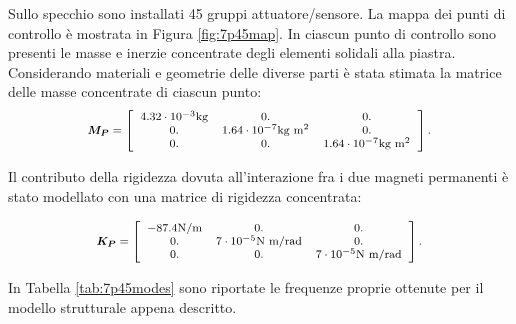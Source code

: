 Sullo specchio sono installati 45 gruppi attuatore/sensore. La mappa dei punti di controllo è mostrata in Figura \ref{fig:7p45map}. In ciascun punto di controllo sono presenti le masse e inerzie concentrate degli elementi solidali alla piastra. Considerando materiali e geometrie delle diverse parti è stata stimata la matrice delle masse concentrate di ciascun punto:
\begin{equation}
\label{eq:7concmass}
\footnotesize
\boldsymbol{M_P} = \left[\begin{array}{ccc}
 4.32\cdot 10^{-3}\text{kg} & 0.   &      0. \\
0.& 1.64\cdot 10^{-7} \text{kg m}^{2}  & 0. \\
0.  & 0.       &1.64\cdot 10^{-7} \text{kg m}^{2}\\

\end{array}\right].
\end{equation}

Il contributo della rigidezza dovuta all'interazione fra i due magneti permanenti è stato modellato con una matrice di rigidezza concentrata:

\begin{equation}
\label{eq:7concstiff}
\footnotesize
\boldsymbol{K_P} = \left[\begin{array}{ccc}
 -87.4\text{N/m} & 0.   &      0. \\
0.& 7\cdot 10^{-5} \text{N m/rad}  & 0. \\
0.  & 0.       &7\cdot 10^{-5} \text{N m/rad}\\

\end{array}\right].
\end{equation}

In Tabella \ref{tab:7p45modes} sono riportate le frequenze proprie ottenute per il modello strutturale appena descritto.

